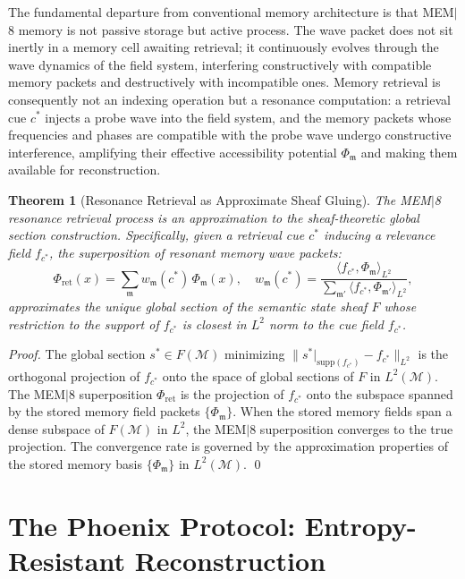 \documentclass[12pt, a4paper, openany]{book}
\theoremstyle{plain}
\newtheorem{theorem}{Theorem}[chapter]
\theoremstyle{definition}
\theoremstyle{remark}
\begin{document}
The fundamental departure from conventional memory architecture is that MEM$|$8 memory is not passive storage but active process. The wave packet does not sit inertly in a memory cell awaiting retrieval; it continuously evolves through the wave dynamics of the field system, interfering constructively with compatible memory packets and destructively with incompatible ones. Memory retrieval is consequently not an indexing operation but a resonance computation: a retrieval cue $c^*$ injects a probe wave into the field system, and the memory packets whose frequencies and phases are compatible with the probe wave undergo constructive interference, amplifying their effective accessibility potential $\Phi_\mathfrak{m}$ and making them available for reconstruction.

\begin{theorem}[Resonance Retrieval as Approximate Sheaf Gluing]
The MEM$|$8 resonance retrieval process is an approximation to the sheaf-theoretic global section construction. Specifically, given a retrieval cue $c^*$ inducing a relevance field $f_{c^*}$, the superposition of resonant memory wave packets:
\[
\Phi_{\mathrm{ret}}(x) = \sum_\mathfrak{m} w_\mathfrak{m}(c^*)\, \Phi_\mathfrak{m}(x),
\quad
w_\mathfrak{m}(c^*) = \frac{\langle f_{c^*}, \Phi_\mathfrak{m}\rangle_{L^2}}{\sum_{\mathfrak{m}'}\langle f_{c^*}, \Phi_{\mathfrak{m}'}\rangle_{L^2}},
\]
approximates the unique global section of the semantic state sheaf $F$ whose restriction to the support of $f_{c^*}$ is closest in $L^2$ norm to the cue field $f_{c^*}$.
\end{theorem}

\begin{proof}
The global section $s^* \in F(\mathcal{M})$ minimizing $\|s^*|_{\mathrm{supp}(f_{c^*})} - f_{c^*}\|_{L^2}$ is the orthogonal projection of $f_{c^*}$ onto the space of global sections of $F$ in $L^2(\mathcal{M})$. The MEM$|$8 superposition $\Phi_{\mathrm{ret}}$ is the projection of $f_{c^*}$ onto the subspace spanned by the stored memory field packets $\{\Phi_\mathfrak{m}\}$. When the stored memory fields span a dense subspace of $F(\mathcal{M})$ in $L^2$, the MEM$|$8 superposition converges to the true projection. The convergence rate is governed by the approximation properties of the stored memory basis $\{\Phi_\mathfrak{m}\}$ in $L^2(\mathcal{M})$. \qed
\end{proof}

\section{The Phoenix Protocol: Entropy-Resistant Reconstruction}
\end{document}
